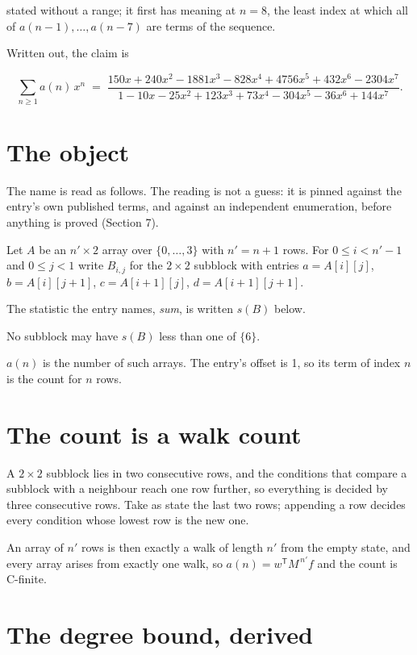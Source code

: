 \documentclass[11pt]{article}
\theoremstyle{definition}
\begin{document}
stated without a range; it first has meaning at $n = 8$, the least index at which all of $a(n-1),\dots,a(n-7)$ are terms of the sequence.

Written out, the claim is

\[\sum_{n \ge 1} a(n)\,x^n \;=\; \frac{150x + 240x^{2} - 1881x^{3} - 828x^{4} + 4756x^{5} + 432x^{6} - 2304x^{7}}{1 - 10x - 25x^{2} + 123x^{3} + 73x^{4} - 304x^{5} - 36x^{6} + 144x^{7}}.\]

\section{The object}

The name is read as follows. The reading is not a guess: it is pinned against the entry's own published terms, and against an independent enumeration, before anything is proved (Section 7).

Let $A$ be an $n' \times 2$ array over $\{0,\dots,3\}$ with $n' = n + 1$ rows. For $0 \le i < n'-1$ and $0 \le j < 1$ write $B_{i,j}$ for the $2\times2$ subblock with entries $a = A[i][j]$, $b = A[i][j{+}1]$, $c = A[i{+}1][j]$, $d = A[i{+}1][j{+}1]$.

The statistic the entry names, {\itshape sum}, is written $s(B)$ below.

No subblock may have $s(B)$ less than one of $\{6\}$.

$a(n)$ is the number of such arrays. The entry's offset is 1, so its term of index $n$ is the count for $n$ rows.

\section{The count is a walk count}

A $2\times2$ subblock lies in two consecutive rows, and the conditions that compare a subblock with a neighbour reach one row further, so everything is decided by three consecutive rows. Take as state the last two rows; appending a row decides every condition whose lowest row is the new one.

An array of $n'$ rows is then exactly a walk of length $n'$ from the empty state, and every array arises from exactly one walk, so $a(n) = w^{\mathsf T}M^{\,n'}f$ and the count is C-finite.

\section{The degree bound, derived}
\end{document}
